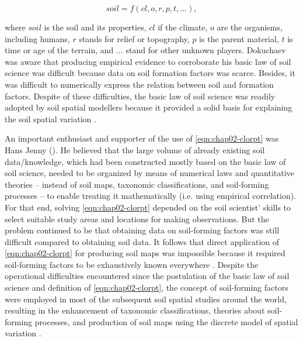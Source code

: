\begin{equation}\label{eqn:chap02-clorpt}
 soil = f(cl, o, r, p, t, \ldots),
\end{equation}

\noindent where $soil$ is the soil and its properties, $cl$ if the climate, $o$ are the organisms, including 
humans, $r$ stands for relief or topography, $p$ is the parent material, $t$ is time or age of the terrain, 
and $\ldots$ stand for other unknown players. Dokuchaev was aware that producing empirical evidence to 
corroborate his basic law of soil science was difficult because data on soil formation factors was scarce. 
Besides, it was difficult to numerically express the relation between soil and formation factors. Despite of 
these difficulties, the basic law of soil science was readily adopted by soil spatial modellers because it 
provided a solid basis for explaining the soil spatial variation \cite{Smith1986}.

An important enthusiast and supporter of the use of \autoref{eqn:chap02-clorpt} was Hans Jenny 
(\citeyear{Jenny1941}). He believed that the large volume of already existing soil data/knowledge, which had 
been constructed mostly based on the basic law of soil science, needed to be organized by means of numerical 
laws and quantitative theories -- instead of soil maps, taxonomic classifications, and soil-forming processes 
-- to enable treating it mathematically (i.e. using empirical correlation). For that end, solving 
\autoref{eqn:chap02-clorpt} depended on the soil scientist' skills to select suitable study areas and locations 
for making observations. But the problem continued to be that obtaining data on soil-forming factors was still 
difficult compared to obtaining soil data. It follows that direct application of \autoref{eqn:chap02-clorpt} 
for producing soil maps was impossible because it required soil-forming factors to be exhaustively known 
everywhere \cite{Jenny1941}. Despite the operational difficulties encountered since the postulation of the 
basic law of soil science and definition of \autoref{eqn:chap02-clorpt}, the concept of soil-forming factors 
were employed in most of the subsequent soil spatial studies around the world, resulting in the enhancement of 
taxonomic classifications, theories about soil-forming processes, and production of soil maps using the 
discrete model of spatial variation \cite{Schelling1970, Hudson1992, BockheimEtAl2000, Legros2006, 
KrasilnikovEtAl2009b, HarteminkEtAl2013}.

